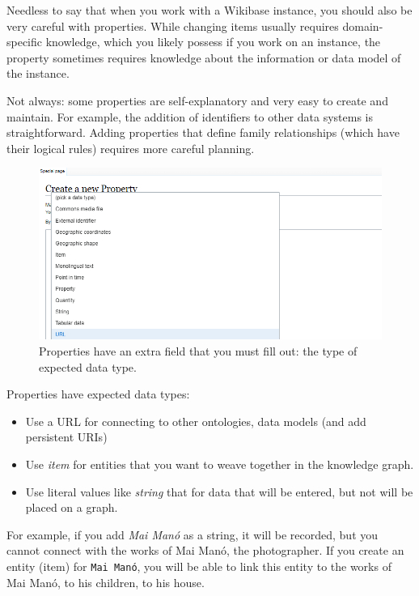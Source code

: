 \documentclass[
  letterpaper,
  DIV=11,
  numbers=noendperiod]{scrreprt}
\begin{document}
Needless to say that when you work with a Wikibase instance, you should
also be very careful with properties. While changing items usually
requires domain-specific knowledge, which you likely possess if you work
on an instance, the property sometimes requires knowledge about the
information or data model of the instance.

Not always: some properties are self-explanatory and very easy to create
and maintain. For example, the addition of identifiers to other data
systems is straightforward. Adding properties that define family
relationships (which have their logical rules) requires more careful
planning.

\begin{figure}[H]

{\centering \includegraphics{png/wikibase/edit/create_new_property-2.png}

}

\caption{Properties have an extra field that you must fill out: the type
of expected data type.}

\end{figure}%

Properties have expected data types:

\begin{itemize}
\item
  Use a URL for connecting to other ontologies, data models (and add
  persistent URIs)
\item
  Use \emph{item} for entities that you want to weave together in the
  knowledge graph.
\item
  Use literal values like \emph{string} that for data that will be
  entered, but not will be placed on a graph.
\end{itemize}

For example, if you add \emph{Mai Manó} as a string, it will be
recorded, but you cannot connect with the works of Mai Manó, the
photographer. If you create an entity (item) for \texttt{Mai\ Manó}, you
will be able to link this entity to the works of Mai Manó, to his
children, to his house.
\end{document}
